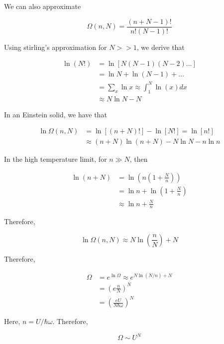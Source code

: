 \documentclass{article}
\newtheorem{one minute paper}[theorem]{One Minute Paper}
\begin{document}
We can also approximate 

\begin{equation}
    \Omega(n,N) = \frac{(n + N -1)!}{n!(N-1)!}
\end{equation}

Using stirling's approximation for $N >>1$, we derive that 

\begin{align}
    \ln(N!) &= \ln\left[ N(N-1)(N-2)\dots \right] \\
    &= \ln N + \ln (N-1) + \dots\\
    &= \sum_x \ln x \approx \int_1^N \ln(x)dx\\
    &\approx N \ln N - N
\end{align}

In an Einstein solid, we have that 

\begin{align}
    \ln \Omega(n,N) &= \ln\left[ (n + N)! \right] - \ln \left[N! \right] = \ln \left[ n! \right] \\
    &\approx (n + N)\ln(n + N) - N\ln N - n \ln n
\end{align}

In the high temperature limit, for $n \gg N$, then 

\begin{align}
    \ln (n + N) &= \ln \left( n \left( 1 + \frac{N}{n} \right) \right) \\\
    &= \ln n + \ln \left( 1 + \frac{N}{n} \right) \\
    &\approx \ln n + \frac{N}{n}
\end{align}

Therefore, 

\begin{equation}
    \ln \Omega (n,N) \approx N\ln \left( \frac{n}{N} \right) + N
\end{equation}

Therefore, 

\begin{align}
    \Omega &= e^{\ln \Omega} \approx e^{N \ln (N/n) + N}\\
    &= \left( e \frac{n}{N} \right)^N\\
    &= \left( \frac{eU}{N \hbar \omega} \right)^N
\end{align}

Here, $n = U/\hbar \omega$. Therefore, 

\begin{equation}
    \Omega \sim U^N
\end{equation}
\end{document}
